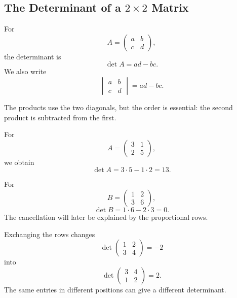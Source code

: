 \subsection{The Determinant of a $2\times2$ Matrix}

\begin{definitionbox}
For
\[
A=\begin{pmatrix}a&b\\c&d\end{pmatrix},
\]
the determinant is
\[
\boxed{\det A=ad-bc}.
\]
We also write
\[
\begin{vmatrix}a&b\\c&d\end{vmatrix}=ad-bc.
\]
\end{definitionbox}

The products use the two diagonals, but the order is essential: the second product is subtracted from the first.

\begin{examplebox}
For
\[
A=\begin{pmatrix}3&1\\2&5\end{pmatrix},
\]
we obtain
\[
\det A=3\cdot5-1\cdot2=13.
\]
\end{examplebox}

\begin{examplebox}
For
\[
B=\begin{pmatrix}1&2\\3&6\end{pmatrix},
\]
\[
\det B=1\cdot6-2\cdot3=0.
\]
The cancellation will later be explained by the proportional rows.
\end{examplebox}

\begin{interpretationbox}
Exchanging the rows changes
\[
\det\begin{pmatrix}1&2\\3&4\end{pmatrix}=-2
\]
into
\[
\det\begin{pmatrix}3&4\\1&2\end{pmatrix}=2.
\]
The same entries in different positions can give a different determinant.
\end{interpretationbox}
